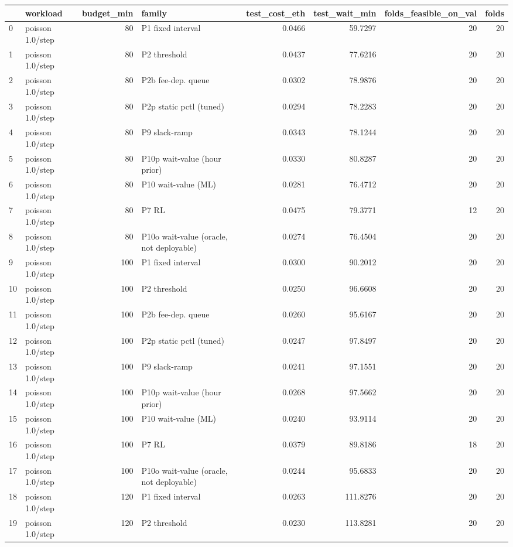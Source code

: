 \begin{tabular}{llrlrrrr}
\toprule
 & workload & budget_min & family & test_cost_eth & test_wait_min & folds_feasible_on_val & folds \\
\midrule
0 & poisson 1.0/step & 80 & P1 fixed interval & 0.0466 & 59.7297 & 20 & 20 \\
1 & poisson 1.0/step & 80 & P2 threshold & 0.0437 & 77.6216 & 20 & 20 \\
2 & poisson 1.0/step & 80 & P2b fee-dep. queue & 0.0302 & 78.9876 & 20 & 20 \\
3 & poisson 1.0/step & 80 & P2p static pctl (tuned) & 0.0294 & 78.2283 & 20 & 20 \\
4 & poisson 1.0/step & 80 & P9 slack-ramp & 0.0343 & 78.1244 & 20 & 20 \\
5 & poisson 1.0/step & 80 & P10p wait-value (hour prior) & 0.0330 & 80.8287 & 20 & 20 \\
6 & poisson 1.0/step & 80 & P10 wait-value (ML) & 0.0281 & 76.4712 & 20 & 20 \\
7 & poisson 1.0/step & 80 & P7 RL & 0.0475 & 79.3771 & 12 & 20 \\
8 & poisson 1.0/step & 80 & P10o wait-value (oracle, not deployable) & 0.0274 & 76.4504 & 20 & 20 \\
9 & poisson 1.0/step & 100 & P1 fixed interval & 0.0300 & 90.2012 & 20 & 20 \\
10 & poisson 1.0/step & 100 & P2 threshold & 0.0250 & 96.6608 & 20 & 20 \\
11 & poisson 1.0/step & 100 & P2b fee-dep. queue & 0.0260 & 95.6167 & 20 & 20 \\
12 & poisson 1.0/step & 100 & P2p static pctl (tuned) & 0.0247 & 97.8497 & 20 & 20 \\
13 & poisson 1.0/step & 100 & P9 slack-ramp & 0.0241 & 97.1551 & 20 & 20 \\
14 & poisson 1.0/step & 100 & P10p wait-value (hour prior) & 0.0268 & 97.5662 & 20 & 20 \\
15 & poisson 1.0/step & 100 & P10 wait-value (ML) & 0.0240 & 93.9114 & 20 & 20 \\
16 & poisson 1.0/step & 100 & P7 RL & 0.0379 & 89.8186 & 18 & 20 \\
17 & poisson 1.0/step & 100 & P10o wait-value (oracle, not deployable) & 0.0244 & 95.6833 & 20 & 20 \\
18 & poisson 1.0/step & 120 & P1 fixed interval & 0.0263 & 111.8276 & 20 & 20 \\
19 & poisson 1.0/step & 120 & P2 threshold & 0.0230 & 113.8281 & 20 & 20 \\

\end{tabular}
